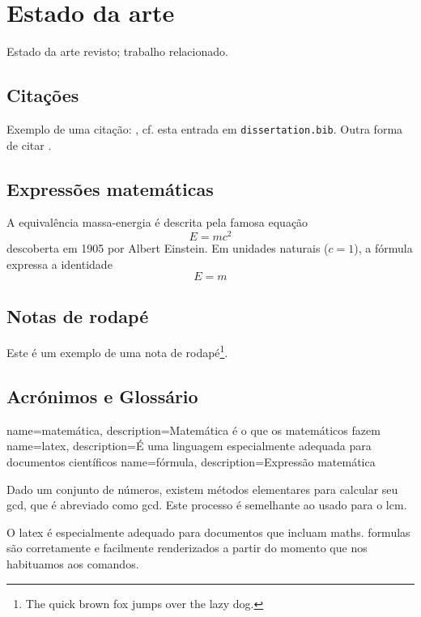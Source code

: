 \chapter{Estado da arte}

Estado da arte revisto; trabalho relacionado.

\section{Citações}
Exemplo de uma citação: \cite{GRM97}, cf. esta entrada em \texttt{dissertation.bib}.
Outra forma de citar \citep{KeR88}.

\section{Expressões matemáticas}
A equivalência massa-energia é descrita pela famosa equação
\begin{equation}
E=mc^2
\end{equation}
descoberta em 1905 por Albert Einstein.
Em unidades naturais ($c = 1$), a fórmula expressa a identidade
\[
E=m
\]

\section{Notas de rodapé}
Este é um exemplo de uma nota de rodapé\footnote{The quick brown fox jumps over the lazy dog.}.

\section{Acrónimos e Glossário}
{
    name=matemática,
    description={Matemática é o que os matemáticos fazem}
}
{
    name=latex,
    description={É uma linguagem especialmente adequada para
documentos científicos}
}
{
    name=fórmula,
    description={Expressão matemática}
}

Dado um conjunto de números, existem métodos elementares para calcular
seu \acrlong{gcd}, que é abreviado como \acrshort{gcd}. Este processo
é semelhante ao usado para o \acrfull{lcm}.

O \Gls{latex} é especialmente adequado
para documentos que incluam \gls{maths}. \Glspl{formula} são corretamente e facilmente renderizados a partir do momento que nos habituamos aos comandos.

